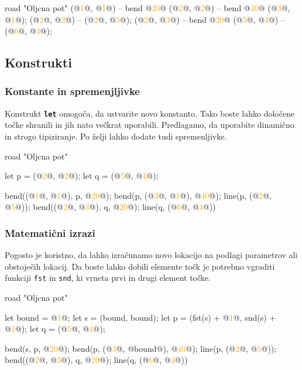 \documentclass{article}
\newcommand\Num[1]{\textcolor{orange}{#1}}
\newcommand\Keyword[1]{{\textbf{\texttt{#1}}}}
\newcommand\Fun[1]{{\texttt{#1}}}
\begin{document}
\begin{CITY}
  road "Oljcna pot" {
    (@\Num{1}@, @\Num{1}@) -- bend @\Num{20}@ (@\Num{2}@, @\Num{2}@) -- bend @\Num{40}@ (@\Num{3}@, @\Num{1}@);
    (@\Num{2}@, @\Num{2}@) -- (@\Num{2}@, @\Num{5}@);
    (@\Num{2}@, @\Num{3}@) -- bend @\Num{20}@ (@\Num{5}@, @\Num{4}@) -- (@\Num{6}@, @\Num{4}@);
  }
\end{CITY}


\subsection{Konstrukti}

\subsubsection{Konstante in spremenjljivke}
Konstrukt \Keyword{let} omogoča, da ustvarite novo konstanto.
Tako boste lahko določene točke shranili in jih nato večkrat uporabili.
Predlagamo, da uporabite dinamično in strogo tipiziranje.
Po želji lahko dodate tudi spremenljivke.

\begin{CITY}
  road "Oljcna pot" {
    let p = (@\Num{2}@, @\Num{2}@);
    let q = (@\Num{5}@, @\Num{4}@);

    bend((@\Num{1}@, @\Num{1}@), p, @\Num{20}@);
    bend(p, (@\Num{3}@, @\Num{1}@), @\Num{40}@);
    line(p, (@\Num{2}@, @\Num{5}@));
    bend((@\Num{2}@, @\Num{3}@), q, @\Num{20}@);
    line(q, (@\Num{6}@, @\Num{4}@))
  }
\end{CITY}

\subsubsection{Matematični izrazi}
Pogosto je koristno, da lahko izračunamo novo lokacijo na podlagi parametrov ali obstoječih lokacij.
Da boste lahko dobili elemente točk je potrebno vgraditi funkciji \Fun{fst} in \Fun{snd}, ki vrneta prvi in drugi element točke.

\begin{CITY}
  road "Oljcna pot" {
    let bound = @\Num{1}@;
    let s = (bound, bound);
    let p = (fst(s) + @\Num{1}@, snd(s) + @\Num{1}@);
    let q = (@\Num{5}@, @\Num{4}@);

    bend(s, p, @\Num{20}@);
    bend(p, (@\Num{3}@, @bound@), @\Num{40}@);
    line(p, (@\Num{2}@, @\Num{5}@));
    bend((@\Num{2}@, @\Num{3}@), q, @\Num{20}@);
    line(q, (@\Num{6}@, @\Num{4}@))
  }
\end{CITY}
\end{document}
